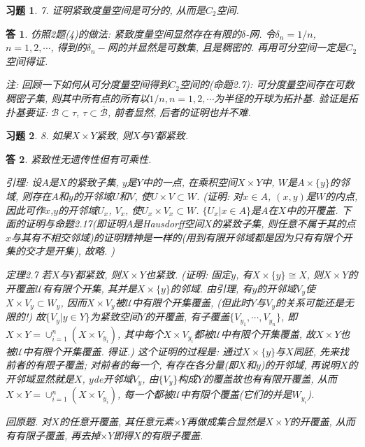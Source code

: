 \documentclass{ctexart}%
\newtheorem*{exercise}{习题}
\newtheorem*{solution}{答}
\theoremstyle{definition}
\theoremstyle{remark}
\begin{document}
\begin{exercise}7. 证明紧致度量空间是可分的, 从而是$C_2$空间.
\end{exercise}
\begin{solution}
仿照2题(4)的做法: 紧致度量空间显然存在有限的$\delta$-网. 令$\delta_n=1/n$, $n=1,2,\cdots$, 得到的$\delta_n-$网的并显然是可数集, 且是稠密的. 再用可分空间一定是$C_2$空间得证.

 注: 回顾一下如何从可分度量空间得到$C_2$空间的(命题2.7): 可分度量空间存在可数稠密子集, 则其中所有点的所有以$1/n,n=1,2,\cdots$为半径的开球为拓扑基. 验证是拓扑基要证: $\mathscr{B}\subset \tau$, $\tau\subset\overline{\mathscr{B}}$, 前者显然, 后者的证明也并不难. 
 \end{solution}
  
\begin{exercise}8. 如果$X\times Y$紧致, 则$X$与$Y$都紧致.
\end{exercise}
\begin{solution}
紧致性无遗传性但有可乘性. 

引理: 设$A$是$X$的紧致子集, $y$是$Y$中的一点, 在乘积空间$X\times Y$中, $W$是$A\times\{y\}$的邻域, 则存在$A$和$y$的开邻域$U$和$V$, 使$U\times V\subset W$. (证明: 对$x\in A$, $(x,y)$是$W$的内点, 因此可作$x$,$y$的开邻域$U_x$, $V_x$, 使$U_x\times V_x\subset W$. $\{U_x|x\in A\}$是$A$在$X$中的开覆盖. 下面的证明与命题2.17(即证明$A$是Hausdorff空间$X$的紧致子集, 则任意不属于其的点$x$与其有不相交邻域)的证明精神是一样的(用到有限开邻域都是因为只有有限个开集的交才是开集), 故略. )

定理2.7 若$X$与$Y$都紧致, 则$X\times Y$也紧致. (证明: 固定$y$, 有$X\times\{y\}\cong X$, 则$X\times Y$的开覆盖$\mathscr{U}$有有限个开集, 其并是$X\times \{y\}$的邻域. 由引理, 有$y$的开邻域$V_y$使$X\times V_y\subset W_y$, 因而$X\times V_y$被$\mathscr{U}$中有限个开集覆盖, (但此时$Y$与$V_y$的关系可能还是无限的!) 故$\{V_y|y\in Y\}$为紧致空间$Y$的开覆盖, 有子覆盖$\{V_{y_1},\cdots, V_{y_n}\}$, 即$X\times Y=\cup_{i=1}^n(X\times V_{y_i})$, 其中每个$X\times V_{y_i}$都被$\mathscr{U}$中有限个开集覆盖, 故$X\times Y$也被$\mathscr{U}$中有限个开集覆盖. 得证.)  这个证明的过程是: 通过$X\times\{y\}$与$X$同胚, 先来找前者的有限子覆盖; 对前者的每一个, 有存在各分量(即$X$和$y$)的开邻域, 再说明$X$的开邻域显然就是$X$, $y$de开邻域$V_y$, 由$\{V_y\}$构成$Y$的覆盖故也有有限开覆盖, 从而$X\times Y=\cup_{i=1}^n(X\times V_{y_i})$, 每一个都被$\mathscr{U}$中有限个覆盖(它们的并是$W_{y_i}$). 

回原题. 对$X$的任意开覆盖, 其任意元素$\times Y$再做成集合显然是$X\times Y$的开覆盖, 从而有有限子覆盖, 再去掉$\times Y$即得$X$的有限子覆盖.
\end{solution}
\end{document}
